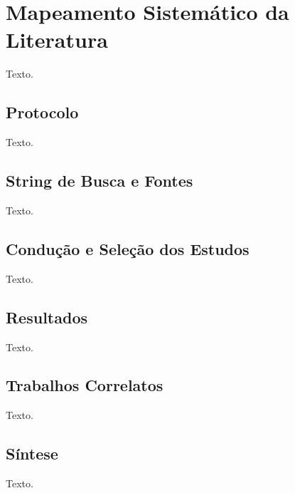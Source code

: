 \chapter{Mapeamento Sistemático da Literatura}
\label{sec-msl}

Texto.


\section{Protocolo}
\label{sec-msl-protocolo}

Texto.


\section{String de Busca e Fontes}
\label{sec-msl-string}

Texto.


\section{Condução e Seleção dos Estudos}
\label{sec-msl-conducao}

Texto.


\section{Resultados}
\label{sec-msl-resultados}

Texto.


\section{Trabalhos Correlatos}
\label{sec-msl-correlatos}

Texto.


\section{Síntese}
\label{sec-msl-sintese}

Texto.
